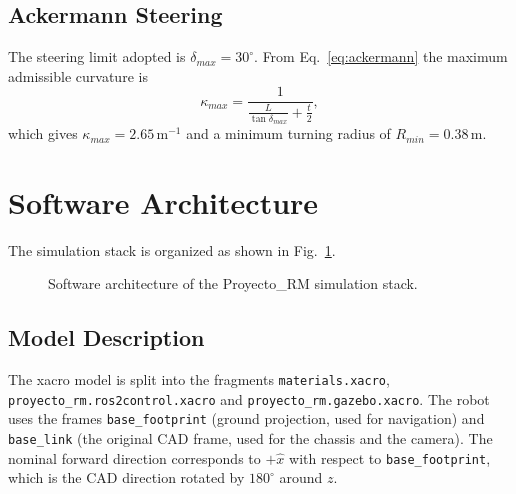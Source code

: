 \documentclass[conference]{IEEEtran}
\begin{document}
\subsection{Ackermann Steering}
\label{sec:ackermann}

The steering limit adopted is $\delta_{max} = 30^\circ$. From
Eq.~\ref{eq:ackermann} the maximum admissible curvature is
\begin{equation}
  \kappa_{max} = \frac{1}{\frac{L}{\tan\delta_{max}} + \frac{t}{2}},
  \label{eq:kappamax}
\end{equation}
which gives $\kappa_{max} = 2.65$\,m$^{-1}$ and a minimum turning radius of
$R_{min} = 0.38$\,m.

\section{Software Architecture}
\label{sec:arch}

The simulation stack is organized as shown in Fig.~\ref{fig:arch}.

\begin{figure}[htbp]
  \centering
  \caption{Software architecture of the Proyecto\_RM simulation stack.}
  \label{fig:arch}
\end{figure}

\subsection{Model Description}
\label{sec:model}

The xacro model is split into the fragments \texttt{materials.xacro},
\texttt{proyecto\_rm.ros2control.xacro} and \texttt{proyecto\_rm.gazebo.xacro}.
The robot uses the frames \texttt{base\_footprint} (ground projection, used for
navigation) and \texttt{base\_link} (the original CAD frame, used for the chassis
and the camera). The nominal forward direction corresponds to $+\hat{x}$ with
respect to \texttt{base\_footprint}, which is the CAD direction rotated by
$180^\circ$ around $z$.
\end{document}

